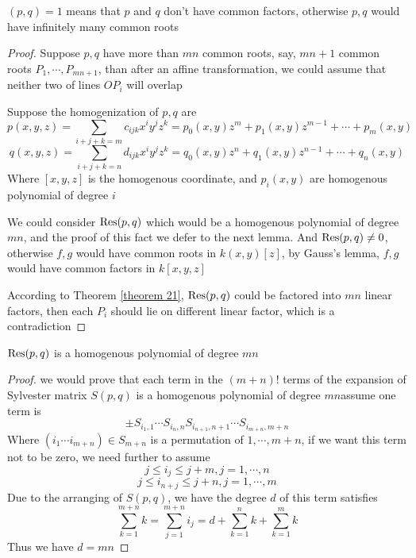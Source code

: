 \begin{remark}
$ (p,q) = 1 $ means that $ p $ and $ q $ don't have common factors, otherwise $ p,q $ would have infinitely many common roots
\end{remark}

\begin{proof}
Suppose $ p,q $ have more than $ mn $ common roots, say, $ mn + 1 $ common roots $ P_{1}, \cdots, P_{mn+1} $, than after an affine transformation, we could assume that neither two of lines $ OP_{i} $ will overlap \par
Suppose the homogenization of $ p,q $ are
$$ p(x,y,z) = \sum_{i+j+k=m} c_{ijk}x^{i}y^{j}z^{k} = p_{0}(x,y)z^{m}+p_{1}(x,y)z^{m-1}+\cdots+p_{m}(x,y) $$
$$ q(x,y,z) = \sum_{i+j+k=n} d_{ijk}x^{i}y^{j}z^{k} = q_{0}(x,y)z^{n}+q_{1}(x,y)z^{n-1}+\cdots+q_{n}(x,y) $$
Where $ [x,y,z] $ is the homogenous coordinate, and $ p_{i}(x,y) $ are homogenous polynomial of degree $ i $ \par
We could consider $ \operatorname{Res}(p,q) $ which would be a homogenous polynomial of degree $ mn $, and the proof of this fact we defer to the next lemma. And $ \operatorname{Res}(p,q) \neq 0 $, otherwise $ f,g $ would have common roots in $ k(x,y)[z] $, by Gauss's lemma, $ f,g $ would have common factors in $ k[x,y,z] $ \par
According to Theorem \ref{theorem 21}, $ \operatorname{Res}(p,q) $ could be factored into $ mn $ linear factors, then each $ P_{i} $ should lie on different linear factor, which is a contradiction
\end{proof}

\begin{lemma}\label{lemma 23}
$\operatorname{Res}(p,q) $ is a homogenous polynomial of degree $ mn $
\end{lemma}

\begin{proof}
we would prove that each term in the $ (m+n)! $ terms of the expansion of Sylvester matrix $ S(p,q) $ is a homogenous polynomial of degree $ mn $assume one term is
$$ \pm S_{i_{1},1} \cdots S_{i_{n},n} S_{i_{n+1},n+1} \cdots S_{i_{m+n},m+n} $$
Where $ (i_{1} \cdots i_{m+n}) \in S_{m+n} $ is a permutation of $ {1, \cdots, m+n} $, if we want this term not to be zero, we need further to assume
$$ j \leq i_{j} \leq j+m, j = 1, \cdots, n $$
$$ j \leq i_{n+j} \leq j+n, j = 1, \cdots, m $$
Due to the arranging of $ S(p,q) $, we have the degree $ d $ of this term satisfies
$$ \sum_{k=1}^{m+n} k = \sum_{j=1}^{m+n} i_{j} = d + \sum_{k=1}^{n} k + \sum_{k=1}^{m} k $$
Thus we have $ d = mn $
\end{proof}